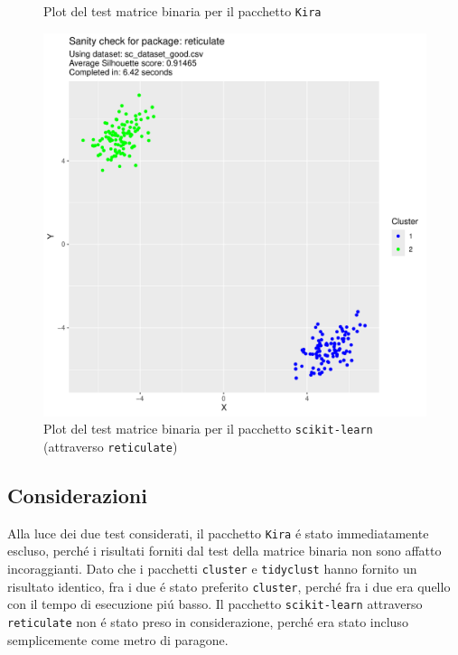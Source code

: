 \documentclass[italian]{article}
\begin{document}
			\begin{figure}[h]
				\caption{Plot del test matrice binaria per il pacchetto \texttt{Kira}}
				\label{fig:kirabm}
			\end{figure}

			\begin{figure}[h]
				\includegraphics[width = \textwidth, page = 3]{results/results_RETICULATE.pdf}
				\caption{Plot del test matrice binaria per il pacchetto
				\texttt{scikit-learn} (attraverso \texttt{reticulate})}
				\label{fig:reticulatebm}
			\end{figure}

		\subsection{Considerazioni}

			Alla luce dei due test considerati, il pacchetto \texttt{Kira}
			é stato immediatamente escluso, perché i risultati forniti dal
			test della matrice binaria non sono affatto incoraggianti.
			Dato che i pacchetti \texttt{cluster} e \texttt{tidyclust}
			hanno fornito un risultato identico, fra i due é stato preferito
			\texttt{cluster}, perché fra i due era quello con il tempo di
			esecuzione piú basso. Il pacchetto \texttt{scikit-learn}
			attraverso \texttt{reticulate} non é stato preso in
			considerazione, perché era stato incluso semplicemente
			come metro di paragone.
\end{document}

